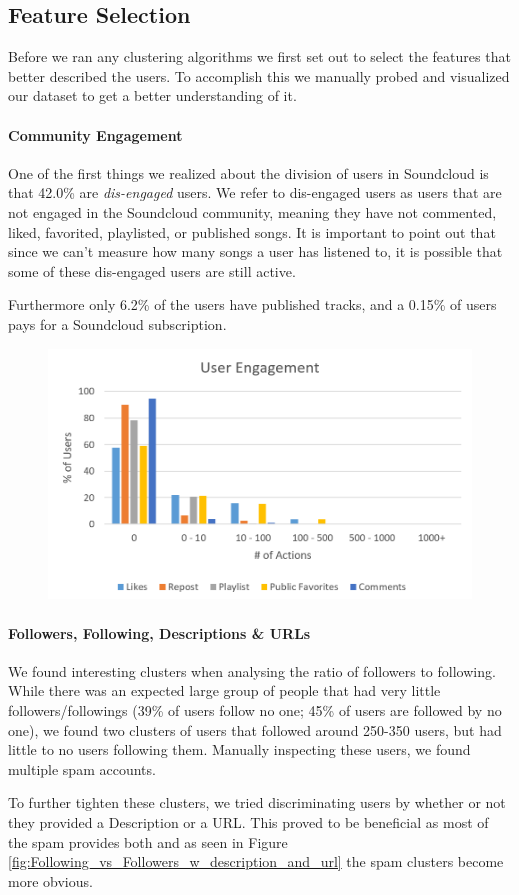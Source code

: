 \documentclass[11pt,twocolumn]{article} %
\begin{document}
\subsection{Feature Selection}
Before we ran any clustering algorithms we first set out to select the features that better described the users. To accomplish this we manually probed and visualized our dataset to get a better understanding of it. 
\paragraph{Community Engagement} One of the first things we realized about the division of users in Soundcloud is that 42.0\% are \textit{dis-engaged} users. We refer to dis-engaged users as users that are not engaged in the Soundcloud community, meaning they have not commented, liked, favorited, playlisted, or published songs. It is important to point out that since we can't measure how many songs a user has listened to, it is possible that some of these dis-engaged users are still active. 
\par Furthermore only 6.2\% of the users have published tracks, and a 0.15\% of users pays for a Soundcloud subscription.

\begin{figure}
\centering
\includegraphics[width=1.0\linewidth]{images/activity_histogram}
\caption{}
\label{fig:activity_histogram}
\end{figure}


\paragraph{Followers, Following, Descriptions \& URLs} We found interesting clusters when analysing the ratio of followers to following. While there was an expected large group of people that had very little followers/followings (39\% of users follow no one; 45\% of users are followed by no one), we found two clusters of users that followed around 250-350 users, but had little to no users following them. Manually inspecting these users, we found multiple spam accounts.
\par To further tighten these clusters, we tried discriminating users by whether or not they provided a Description or a URL. This proved to be beneficial as most  of the spam provides both and as seen in Figure \ref{fig:Following_vs_Followers_w_description_and_url} the spam clusters become more obvious.
\end{document}
